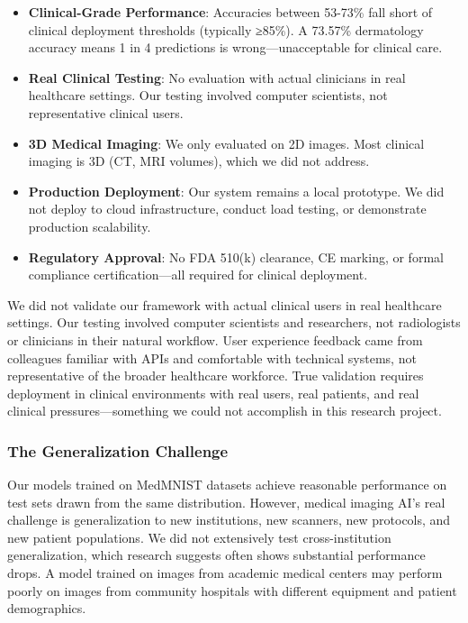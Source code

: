 \documentclass[12pt,a4paper]{article}
\begin{document}
\begin{itemize}
    \item \textbf{Clinical-Grade Performance}: Accuracies between 53-73\% fall short of clinical deployment thresholds (typically ≥85\%). A 73.57\% dermatology accuracy means 1 in 4 predictions is wrong—unacceptable for clinical care.
    
    \item \textbf{Real Clinical Testing}: No evaluation with actual clinicians in real healthcare settings. Our testing involved computer scientists, not representative clinical users.
    
    \item \textbf{3D Medical Imaging}: We only evaluated on 2D images. Most clinical imaging is 3D (CT, MRI volumes), which we did not address.
    
    \item \textbf{Production Deployment}: Our system remains a local prototype. We did not deploy to cloud infrastructure, conduct load testing, or demonstrate production scalability.
    
    \item \textbf{Regulatory Approval}: No FDA 510(k) clearance, CE marking, or formal compliance certification—all required for clinical deployment.
\end{itemize}

We did not validate our framework with actual clinical users in real healthcare settings. Our testing involved computer scientists and researchers, not radiologists or clinicians in their natural workflow. User experience feedback came from colleagues familiar with APIs and comfortable with technical systems, not representative of the broader healthcare workforce. True validation requires deployment in clinical environments with real users, real patients, and real clinical pressures—something we could not accomplish in this research project.

\subsubsection{The Generalization Challenge}

Our models trained on MedMNIST datasets achieve reasonable performance on test sets drawn from the same distribution. However, medical imaging AI's real challenge is generalization to new institutions, new scanners, new protocols, and new patient populations. We did not extensively test cross-institution generalization, which research suggests often shows substantial performance drops. A model trained on images from academic medical centers may perform poorly on images from community hospitals with different equipment and patient demographics.
\end{document}
